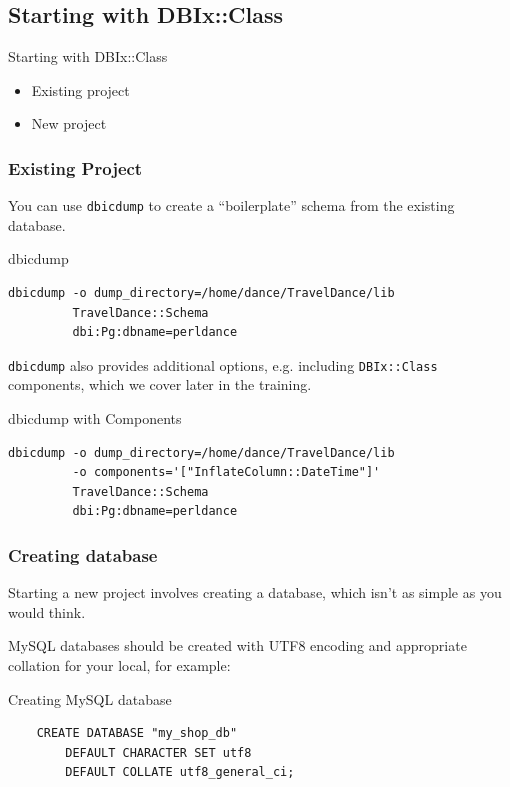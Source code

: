 \subsection{Starting with DBIx::Class}

\begin{frame}{Starting with DBIx::Class}
\begin{itemize}
\item Existing project
\item New project
\end{itemize}
\end{frame}

\subsubsection{Existing Project}

You can use \verb|dbicdump| to create a ``boilerplate'' schema from the
existing database.

\begin{frame}[fragile]{dbicdump}
\begin{lstlisting}
dbicdump -o dump_directory=/home/dance/TravelDance/lib 
         TravelDance::Schema 
         dbi:Pg:dbname=perldance
\end{lstlisting}
\end{frame}

\verb|dbicdump| also provides additional options, e.g.
including \verb|DBIx::Class| components, which we cover
later in the training.

\begin{frame}[fragile]{dbicdump with Components}
\begin{lstlisting}
dbicdump -o dump_directory=/home/dance/TravelDance/lib 
         -o components='["InflateColumn::DateTime"]'
         TravelDance::Schema 
         dbi:Pg:dbname=perldance
\end{lstlisting}
\end{frame}

\subsubsection{Creating database}
Starting a new project involves creating a database, which
isn't as simple as you would think.

MySQL databases should be created with UTF8 encoding and appropriate 
collation for your local, for example:

\begin{frame}[fragile]{Creating MySQL database}
\begin{lstlisting}
    CREATE DATABASE "my_shop_db"
        DEFAULT CHARACTER SET utf8
        DEFAULT COLLATE utf8_general_ci;
\end{lstlisting}
\end{frame}

